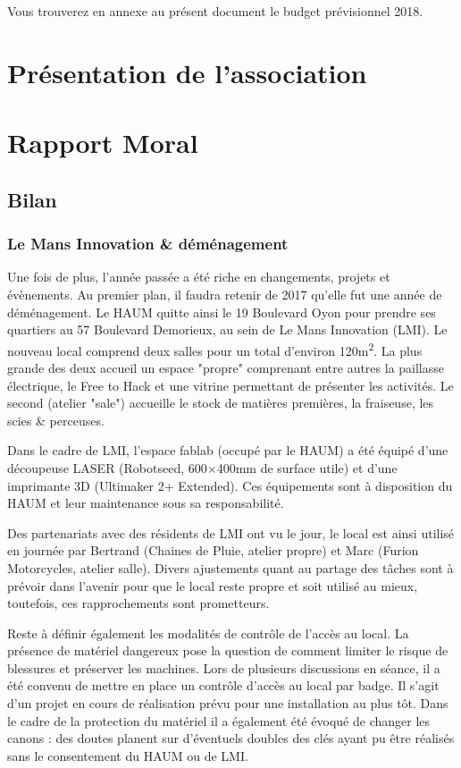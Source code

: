 \documentclass[11pt]{article}
\begin{document}
Vous trouverez en annexe au présent document le budget prévisionnel 2018.

\section{Présentation de l'association}

\section{Rapport Moral}

\subsection{Bilan}

\subsubsection{Le Mans Innovation \& déménagement}
Une fois de plus, l'année passée a été riche en changements, projets et évènements. Au
premier plan, il faudra retenir de 2017 qu'elle fut une année de déménagement. Le HAUM
quitte ainsi le 19 Boulevard Oyon pour prendre ses quartiers au 57 Boulevard Demorieux, au
sein de Le Mans Innovation (LMI).
Le nouveau local comprend deux salles pour un total d'environ 120m\textsuperscript{2}. La
plus grande des deux accueil un espace "propre" comprenant entre autres la paillasse
électrique, le Free to Hack et une vitrine permettant de présenter les activités. Le
second (atelier "sale") accueille le stock de matières premières, la fraiseuse, les scies
\& perceuses.

Dans le cadre de LMI, l'espace fablab (occupé par le HAUM) a été équipé
d'une découpeuse LASER (Robotseed, 600$\times$400mm de surface utile) et d'une imprimante 3D
(Ultimaker 2+ Extended). Ces équipements sont à disposition du HAUM et leur maintenance
sous sa responsabilité.

Des partenariats avec des résidents de LMI ont vu le jour, le local est ainsi utilisé en
journée par Bertrand (Chaines de Pluie, atelier propre) et Marc (Furion Motorcycles,
atelier salle). Divers ajustements quant au partage des tâches sont à prévoir dans
l'avenir pour que le local reste propre et soit utilisé au mieux, toutefois, ces
rapprochements sont prometteurs.

Reste à définir également les modalités de contrôle de l'accès au local. La présence de
matériel dangereux pose la question de comment limiter le risque de blessures et préserver
les machines. Lors de plusieurs discussions en séance, il a été convenu de mettre en place
un contrôle d'accès au local par badge. Il s'agit d'un projet en cours de réalisation
prévu pour une installation au plus tôt. Dans le cadre de la protection du matériel il a
également été évoqué de changer les canons : des doutes planent sur d'éventuels doubles
des clés ayant pu être réalisés sans le consentement du HAUM ou de LMI.
\end{document}
